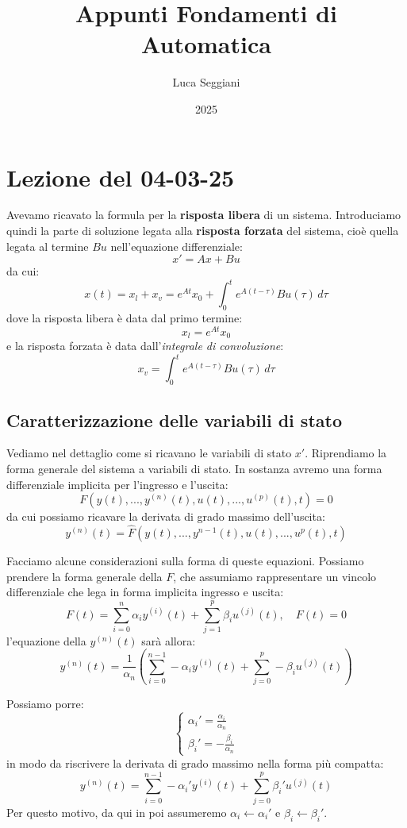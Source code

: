 \documentclass[a4paper,11pt]{article}
\title{Appunti Fondamenti di Automatica}
\author{Luca Seggiani}
\date{2025}
\begin{document}
\section{Lezione del 04-03-25}

\thispagestyle{empty}
\pagestyle{fancy}

Avevamo ricavato la formula per la \textbf{risposta libera} di un sistema.
Introduciamo quindi la parte di soluzione legata alla \textbf{risposta forzata} del sistema, cioè quella legata al termine $Bu$ nell'equazione differenziale:
$$
x' = Ax + Bu
$$
da cui:
$$
x(t) = x_l + x_v = e^{At} x_0 + \int_0^t e^{A(t - \tau)} Bu(\tau) \, d\tau
$$
dove la risposta libera è data dal primo termine:
$$
x_l = e^{At} x_0 
$$
e la risposta forzata è data dall'\textit{integrale di convoluzione}:
$$
x_v = \int_0^t e^{A(t - \tau)} Bu(\tau) \, d\tau
$$

\subsection{Caratterizzazione delle variabili di stato}
Vediamo nel dettaglio come si ricavano le variabili di stato $x'$.
Riprendiamo la forma generale del sistema a variabili di stato.
In sostanza avremo una forma differenziale implicita per l'ingresso e l'uscita: 
$$
F \left( y(t), ..., y^{(n)}(t), u(t), ..., u^{(p)}(t), t \right) = 0
$$
da cui possiamo ricavare la derivata di grado massimo dell'uscita: 
$$
y^{(n)}(t) = \hat{F} \left( y(t), ..., y^{n-1}(t), u(t), ..., u^p(t), t \right)
$$

\par\smallskip

Facciamo alcune considerazioni sulla forma di queste equazioni.
Possiamo prendere la forma generale della $F$, che assumiamo rappresentare  un vincolo differenziale che lega in forma implicita ingresso e uscita:
$$
F(t) = \sum_{i = 0}^{n} \alpha_i y^{(i)} (t) + \sum_{j = 1}^{p} \beta_i u^{(j)} (t), \quad F(t) = 0
$$
l'equazione della $y^{(n)} (t)$ sarà allora:
$$
y^{(n)} (t) = \frac{1}{\alpha_n} \left( \sum_{i = 0}^{n - 1} - \alpha_i y^{(i)} (t) + \sum_{j = 0}^p - \beta_i u^{(j)} (t) \right)
$$

Possiamo porre:
\[
	\begin{cases}		
		\alpha_i ' = \frac{\alpha_i}{\alpha_n} \\ 
		\beta_i ' = - \frac{\beta_i}{\alpha_n}
	\end{cases}
\]
in modo da riscrivere la derivata di grado massimo nella forma più compatta:
$$
y^{(n)} (t) = \sum_{i = 0}^{n - 1} - \alpha_i ' y^{(i)} (t) + \sum_{j = 0}^p  \beta_i ' u^{(j)} (t) 
$$
Per questo motivo, da qui in poi assumeremo $\alpha_i \leftarrow \alpha_i '$ e $\beta_i \leftarrow \beta_i '$.
\end{document}

